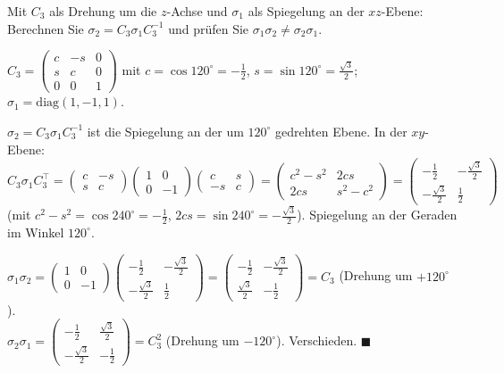 \begin{aufgabe}
Mit $C_3$ als Drehung um die $z$-Achse und $\sigma_1$ als Spiegelung an der $xz$-Ebene: Berechnen Sie $\sigma_2 = C_3\sigma_1C_3^{-1}$ und prüfen Sie $\sigma_1\sigma_2\ne\sigma_2\sigma_1$.

\loesung
{}
$C_3 = \begin{pmatrix}c & -s & 0\\ s & c & 0\\ 0 & 0 & 1\end{pmatrix}$ mit $c = \cos120^{\circ} = -\tfrac12$, $s = \sin120^{\circ} = \tfrac{\sqrt3}{2}$; $\sigma_1 = \mathrm{diag}(1, -1, 1)$.

$\sigma_2 = C_3\sigma_1C_3^{-1}$ ist die Spiegelung an der um $120^{\circ}$ gedrehten Ebene. In der $xy$-Ebene: $C_3\sigma_1C_3^{\top} = \begin{pmatrix}c & -s\\ s & c\end{pmatrix}\begin{pmatrix}1 & 0\\ 0 & -1\end{pmatrix}\begin{pmatrix}c & s\\ -s & c\end{pmatrix} = \begin{pmatrix}c^{2} - s^{2} & 2cs\\ 2cs & s^{2} - c^{2}\end{pmatrix} = \begin{pmatrix}-\tfrac12 & -\tfrac{\sqrt3}{2}\\ -\tfrac{\sqrt3}{2} & \tfrac12\end{pmatrix}$ (mit $c^{2} - s^{2} = \cos240^{\circ} = -\tfrac12$, $2cs = \sin240^{\circ} = -\tfrac{\sqrt3}{2}$). Spiegelung an der Geraden im Winkel $120^{\circ}$. \checkmark

$\sigma_1\sigma_2 = \begin{pmatrix}1 & 0\\ 0 & -1\end{pmatrix}\begin{pmatrix}-\tfrac12 & -\tfrac{\sqrt3}{2}\\ -\tfrac{\sqrt3}{2} & \tfrac12\end{pmatrix} = \begin{pmatrix}-\tfrac12 & -\tfrac{\sqrt3}{2}\\ \tfrac{\sqrt3}{2} & -\tfrac12\end{pmatrix} = C_3$ (Drehung um $+120^{\circ}$). \checkmark\\
$\sigma_2\sigma_1 = \begin{pmatrix}-\tfrac12 & \tfrac{\sqrt3}{2}\\ -\tfrac{\sqrt3}{2} & -\tfrac12\end{pmatrix} = C_3^{2}$ (Drehung um $-120^{\circ}$). Verschieden. $\blacksquare$


\end{aufgabe}
